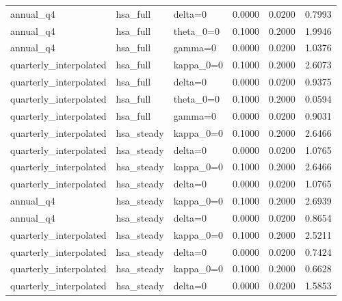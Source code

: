 \begin{tabular}{lllrrr}
annual\_q4 & hsa\_full & delta=0 & 0.0000 & 0.0200 & 0.7993 \\
annual\_q4 & hsa\_full & theta\_0=0 & 0.1000 & 0.2000 & 1.9946 \\
annual\_q4 & hsa\_full & gamma=0 & 0.0000 & 0.0200 & 1.0376 \\
quarterly\_interpolated & hsa\_full & kappa\_0=0 & 0.1000 & 0.2000 & 2.6073 \\
quarterly\_interpolated & hsa\_full & delta=0 & 0.0000 & 0.0200 & 0.9375 \\
quarterly\_interpolated & hsa\_full & theta\_0=0 & 0.1000 & 0.2000 & 0.0594 \\
quarterly\_interpolated & hsa\_full & gamma=0 & 0.0000 & 0.0200 & 0.9031 \\
quarterly\_interpolated & hsa\_steady & kappa\_0=0 & 0.1000 & 0.2000 & 2.6466 \\
quarterly\_interpolated & hsa\_steady & delta=0 & 0.0000 & 0.0200 & 1.0765 \\
quarterly\_interpolated & hsa\_steady & kappa\_0=0 & 0.1000 & 0.2000 & 2.6466 \\
quarterly\_interpolated & hsa\_steady & delta=0 & 0.0000 & 0.0200 & 1.0765 \\
annual\_q4 & hsa\_steady & kappa\_0=0 & 0.1000 & 0.2000 & 2.6939 \\
annual\_q4 & hsa\_steady & delta=0 & 0.0000 & 0.0200 & 0.8654 \\
quarterly\_interpolated & hsa\_steady & kappa\_0=0 & 0.1000 & 0.2000 & 2.5211 \\
quarterly\_interpolated & hsa\_steady & delta=0 & 0.0000 & 0.0200 & 0.7424 \\
quarterly\_interpolated & hsa\_steady & kappa\_0=0 & 0.1000 & 0.2000 & 0.6628 \\
quarterly\_interpolated & hsa\_steady & delta=0 & 0.0000 & 0.0200 & 1.5853 \\
\bottomrule
\end{tabular}
